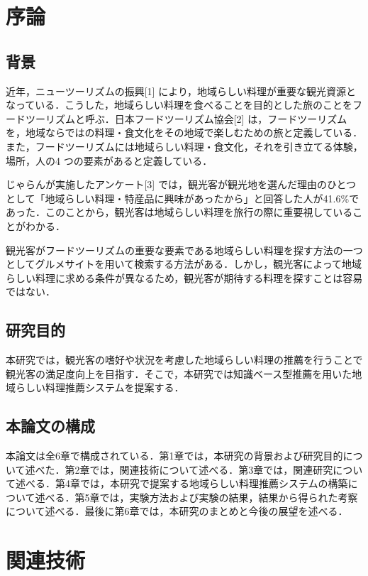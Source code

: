 \documentclass{funthesis}
\begin{document}
\chapter{序論} 
\section{背景}
近年，ニューツーリズムの振興[1] により，地域らしい料理が重要な観光資源となっている．こうした，地域らしい料理を食べることを目的とした旅のことをフードツーリズムと呼ぶ．日本フードツーリズム協会[2] は，フードツーリズムを，地域ならではの料理・食文化をその地域で楽しむための旅と定義している．また，フードツーリズムには地域らしい料理・食文化，それを引き立てる体験，場所，人の4 つの要素があると定義している．

じゃらんが実施したアンケート[3] では，観光客が観光地を選んだ理由のひとつとして「地域らしい料理・特産品に興味があったから」と回答した人が41.6\%であった．このことから，観光客は地域らしい料理を旅行の際に重要視していることがわかる．

観光客がフードツーリズムの重要な要素である地域らしい料理を探す方法の一つとしてグルメサイトを用いて検索する方法がある．しかし，観光客によって地域らしい料理に求める条件が異なるため，観光客が期待する料理を探すことは容易ではない．

\section{研究目的}  
本研究では，観光客の嗜好や状況を考慮した地域らしい料理の推薦を行うことで観光客の満足度向上を目指す．そこで，本研究では知識ベース型推薦を用いた地域らしい料理推薦システムを提案する．

\section{本論文の構成}
本論文は全6章で構成されている．第1章では，本研究の背景および研究目的について述べた．第2章では，関連技術について述べる．第3章では，関連研究について述べる．第4章では，本研究で提案する地域らしい料理推薦システムの構築について述べる．第5章では，実験方法および実験の結果，結果から得られた考察について述べる．最後に第6章では，本研究のまとめと今後の展望を述べる．

\chapter{関連技術}
\end{document}
